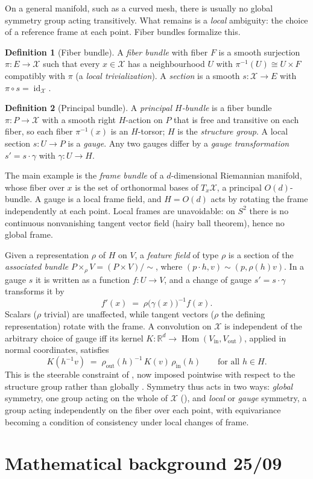 \documentclass[11pt]{article}
\theoremstyle{plain}
\theoremstyle{definition}
\newtheorem{Definition}{Definition}[section]
\begin{document}
On a general manifold, such as a curved mesh, there is usually no global symmetry group acting transitively.
What remains is a \emph{local} ambiguity: the choice of a reference frame at each point.
Fiber bundles formalize this.

\begin{Definition}[Fiber bundle]\label{def:fiber-bundle}
A \emph{fiber bundle} with fiber $F$ is a smooth surjection $\pi : E\to\mathcal{X}$ such that every $x\in\mathcal{X}$ has a neighbourhood $U$ with $\pi^{-1}(U)\cong U\times F$ compatibly with $\pi$ (a \emph{local trivialization}).
A \emph{section} is a smooth $s:\mathcal{X}\to E$ with $\pi\circ s = \operatorname{id}_{\mathcal{X}}$.
\end{Definition}

\begin{Definition}[Principal bundle]\label{def:principal-bundle}
A \emph{principal $H$-bundle} is a fiber bundle $\pi : P\to\mathcal{X}$ with a smooth right $H$-action on $P$ that is free and transitive on each fiber, so each fiber $\pi^{-1}(x)$ is an $H$-torsor; $H$ is the \emph{structure group}.
A local section $s : U\to P$ is a \emph{gauge}.
Any two gauges differ by a \emph{gauge transformation} $s' = s\cdot\gamma$ with $\gamma : U\to H$.
\end{Definition}

The main example is the \emph{frame bundle} of a $d$-dimensional Riemannian manifold, whose fiber over $x$ is the set of orthonormal bases of $T_x\mathcal{X}$, a principal $O(d)$-bundle.
A gauge is a local frame field, and $H = O(d)$ acts by rotating the frame independently at each point.
Local frames are unavoidable: on $S^2$ there is no continuous nonvanishing tangent vector field (hairy ball theorem), hence no global frame.

Given a representation $\rho$ of $H$ on $V$, a \emph{feature field} of type $\rho$ is a section of the \emph{associated bundle} $P\times_\rho V = (P\times V)/\!\sim$, where $(p\cdot h,v)\sim(p,\rho(h)v)$.
In a gauge $s$ it is written as a function $f: U\to V$, and a change of gauge $s' = s\cdot\gamma$ transforms it by
\[
    f'(x) \;=\; \rho\bigl(\gamma(x)\bigr)^{-1} f(x).
\]
Scalars ($\rho$ trivial) are unaffected, while tangent vectors ($\rho$ the defining representation) rotate with the frame.
A convolution on $\mathcal{X}$ is independent of the arbitrary choice of gauge iff its kernel $K : \mathbb{R}^d\to\operatorname{Hom}(V_{\mathrm{in}},V_{\mathrm{out}})$, applied in normal coordinates, satisfies
\[
    K(h^{-1}v) \;=\; \rho_{\mathrm{out}}(h)^{-1}\,K(v)\,\rho_{\mathrm{in}}(h) \qquad \text{for all } h\in H.
\]
This is the steerable constraint of , now imposed pointwise with respect to the structure group rather than globally \citep{cohen2019p3icml,weiler2021,weiler2026}.
Symmetry thus acts in two ways: \emph{global} symmetry, one group acting on the whole of $\mathcal{X}$ (), and \emph{local} or \emph{gauge} symmetry, a group acting independently on the fiber over each point, with equivariance becoming a condition of consistency under local changes of frame.


\section{Mathematical background 25/09}





\end{document}
